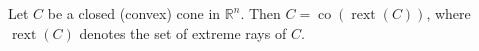 Let $C$ be a closed (convex) cone in $\mathbb{R}^n$. Then $C = \operatorname{co}(\operatorname{rext}(C))$, where $\operatorname{rext}(C)$ denotes the set of extreme rays of $C$.